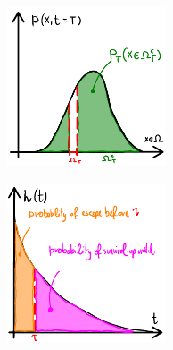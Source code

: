 \documentclass[../main.tex]{subfiles}
\begin{document}
\begin{figure}[H]
    \centering 
    \begin{subfigure}[b]{0.325\textwidth}
        \centering 
        \includegraphics[keepaspectratio, width = \linewidth]{../figures/fig2.4.1.1.a.pdf}
        \caption{}
        \label{fig2.4.1.1.a}
    \end{subfigure}
    \begin{subfigure}[b]{0.325\textwidth}
        \centering 
        \includegraphics[keepaspectratio, width = \linewidth]{../figures/fig2.4.1.1.b.pdf}
        \caption{}
        \label{fig2.4.1.1.b}
    \end{subfigure}
    \caption{}
    \label{fig2.4.1.1}
\end{figure}
\end{document}
